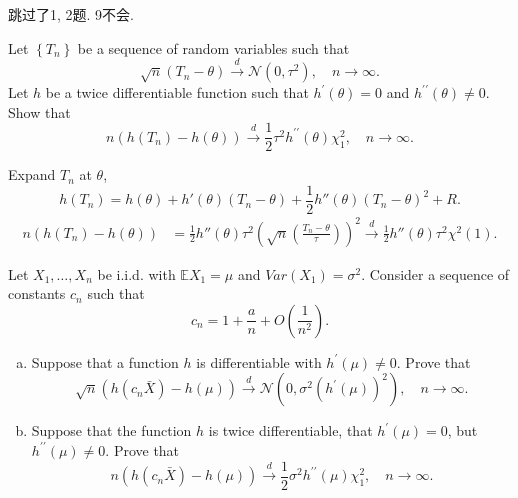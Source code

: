 \chapter{}

跳过了1, 2题. 9不会. 



\begin{ex}
    Let \(\left\{T_{n}\right\}\) be a sequence of random variables such that
    \[
        \sqrt{n}\left(T_{n}-\theta\right) \stackrel{d}{\rightarrow} \mathcal{N}\left(0, \tau^{2}\right), \quad n \rightarrow \infty. 
    \]
    Let \(h\) be a twice differentiable function such that \(h^{\prime}(\theta)=0\) and \(h^{\prime \prime}(\theta) \neq 0\). Show that
    \[
        n\left(h\left(T_{n}\right)-h(\theta)\right) \stackrel{d}{\rightarrow} \frac{1}{2} \tau^{2} h^{\prime \prime}(\theta) \chi_{1}^{2}, \quad n \rightarrow \infty. 
    \]
\end{ex}

\begin{solution}
    Expand $T_n$ at $\theta$, 
    \[
            h(T_n)=h(\theta)+h'(\theta)(T_n-\theta)+\frac{1}{2}h''(\theta)(T_n-\theta)^2+R. 
    \]
    \[
        \begin{aligned}
            n(h(T_n)-h(\theta))&=\frac{1}{2}h''(\theta)\tau^2\left(\sqrt{n}\left(\frac{T_{n}-\theta}{\tau}\right)\right)^2\stackrel{d}{\rightarrow}\frac{1}{2}h''(\theta)\tau^2\chi^2(1). 
        \end{aligned}
    \]
\end{solution}

\begin{ex}
    Let \(X_{1}, \ldots, X_{n}\) be i.i.d. with \(\mathbb{E} X_{1}=\mu\) and \(Var\left(X_{1}\right)=\sigma^{2}\). Consider a sequence of constants \(c_{n}\) such that
    \[
        c_{n}=1+\frac{a}{n}+O\left(\frac{1}{n^{2}}\right) .
    \]
    \begin{enumerate}[(a)]
        \item Suppose that a function \(h\) is differentiable with \(h^{\prime}(\mu) \neq 0\). Prove that
        \[
            \sqrt{n}\left(h\left(c_{n} \bar{X}\right)-h(\mu)\right) \stackrel{d}{\rightarrow} \mathcal{N}\left(0, \sigma^{2}\left(h^{\prime}(\mu)\right)^{2}\right), \quad n \rightarrow \infty. 
        \]
        \item Suppose that the function \(h\) is twice differentiable, that \(h^{\prime}(\mu)=0\), but \(h^{\prime \prime}(\mu) \neq 0\). Prove that
        \[
            n\left(h\left(c_{n} \bar{X}\right)-h(\mu)\right) \stackrel{d}{\rightarrow} \frac{1}{2} \sigma^{2} h^{\prime \prime}(\mu) \chi_{1}^{2}, \quad n \rightarrow \infty. 
        \]
    \end{enumerate}
\end{ex}

